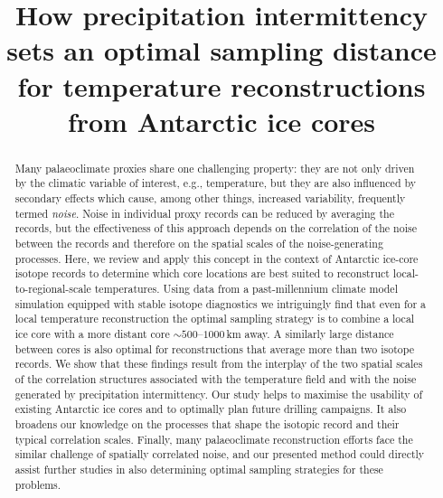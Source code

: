 \documentclass[cp, manuscript]{copernicus}
\begin{document}
\title{How precipitation intermittency sets an optimal sampling distance for
  temperature reconstructions from Antarctic ice cores}




\received{}
\pubdiscuss{}
\revised{}
\accepted{}
\published{}


\maketitle

\begin{abstract} Many palaeoclimate proxies share one challenging property: they
are not only driven by the climatic variable of interest, e.g., temperature, but
they are also influenced by secondary effects which cause, among other things,
increased variability, frequently termed \emph{noise}. Noise in individual proxy
records can be reduced by averaging the records, but the effectiveness of this
approach depends on the correlation of the noise between the records and
therefore on the spatial scales of the noise-generating processes. Here, we
review and apply this concept in the context of Antarctic ice-core isotope
records to determine which core locations are best suited to reconstruct
local-to-regional-scale temperatures. Using data from a past-millennium climate
model simulation equipped with stable isotope diagnostics we intriguingly find
that even for a local temperature reconstruction the optimal sampling strategy
is to combine a local ice core with a more distant core $\sim500$--$1000$\,km
away. A similarly large distance between cores is also optimal for
reconstructions that average more than two isotope records. We show that these
findings result from the interplay of the two spatial scales of the correlation
structures associated with the temperature field and with the noise generated by
precipitation intermittency. Our study helps to maximise the usability of
existing Antarctic ice cores and to optimally plan future drilling campaigns. It
also broadens our knowledge on the processes that shape the isotopic record and
their typical correlation scales. Finally, many palaeoclimate reconstruction
efforts face the similar challenge of spatially correlated noise, and our
presented method could directly assist further studies in also determining
optimal sampling strategies for these problems.
\end{abstract}
\end{document}
